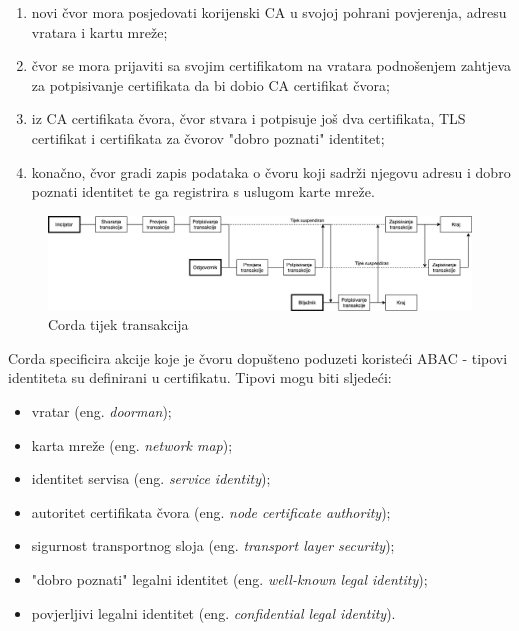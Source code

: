 \documentclass[times, utf8, diplomski]{fer}
\begin{document}
\begin{enumerate}

\item novi čvor mora posjedovati korijenski CA u svojoj pohrani povjerenja, adresu vratara i kartu mreže;

\item čvor se mora prijaviti sa svojim certifikatom na vratara podnošenjem zahtjeva za potpisivanje certifikata da bi dobio CA certifikat čvora;

\item iz CA certifikata čvora, čvor stvara i potpisuje još dva certifikata, TLS certifikat i certifikata za čvorov "dobro poznati" identitet;

\item konačno, čvor gradi zapis podataka o čvoru koji sadrži njegovu adresu i dobro poznati identitet te ga registrira s uslugom karte mreže.

\end{enumerate}

\begin{figure}[htb]
\centering
\includegraphics[width=15cm]{imgs/Corda flow.png}
\caption{Corda tijek transakcija}
\label{fig:cordaflow}
\end{figure}

Corda specificira akcije koje je čvoru dopušteno poduzeti koristeći ABAC - tipovi identiteta su definirani u certifikatu. Tipovi mogu biti sljedeći:

\begin{itemize}

\item vratar (eng.  \textit{doorman});

\item karta mreže (eng.  \textit{network map});

\item identitet servisa (eng. \textit{service identity});

\item autoritet certifikata čvora (eng.  \textit{node certificate authority});

\item sigurnost transportnog sloja (eng.  \textit{transport layer security});

\item "dobro poznati" legalni identitet (eng. \textit{well-known legal identity});

\item povjerljivi legalni identitet (eng.  \textit{confidential legal identity}).

\end{itemize}
\end{document}
